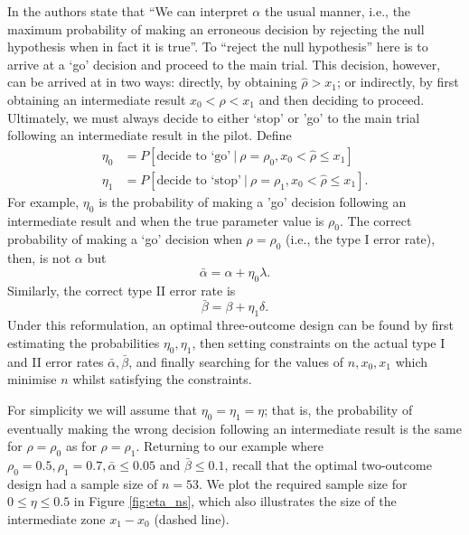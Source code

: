 \documentclass[sagev]{sagej} %
\begin{document}
In \cite{Sargent2001} the authors state that ``We  can interpret $\alpha$  the usual  manner,  i.e., the  maximum probability of making an erroneous decision by rejecting the null hypothesis when in fact it is true''. To ``reject the null hypothesis'' here is to arrive at a `go' decision and proceed to the main trial. This decision, however, can be arrived at in two ways: directly, by obtaining $\hat{\rho} > x_1$; or indirectly, by first obtaining an intermediate result $x_0 < \hat{\rho} < x_1$ and then deciding to proceed. Ultimately, we must always decide to either `stop' or 'go' to the main trial following an intermediate result in the pilot. Define
\begin{align}
\eta_0 &= P[\text{decide to `go'} ~|~ \rho = \rho_0, x_0 < \hat{\rho} \leq x_1] \\
\eta_1 &= P[\text{decide to `stop'} ~|~ \rho = \rho_1, x_0 < \hat{\rho} \leq x_1].
\end{align}
For example, $\eta_0$ is the probability of making a 'go' decision following an intermediate result and when the true parameter value is $\rho_0$. The correct probability of making a `go' decision when $\rho = \rho_0$ (i.e., the type I error rate), then, is not $\alpha$ but
$$
\bar{\alpha} = \alpha + \eta_0 \lambda.
$$
Similarly, the correct type II error rate is
$$
\bar{\beta} = \beta + \eta_1 \delta.
$$
Under this reformulation, an optimal three-outcome design can be found by first estimating the probabilities $\eta_0, \eta_1$, then setting constraints on the actual type I and II error rates $\bar{\alpha}, \bar{\beta}$, and finally searching for the values of  $n, x_0, x_1$ which minimise $n$ whilst satisfying the constraints. 

For simplicity we will assume that $\eta_0 = \eta_1 = \eta$; that is, the probability of eventually making the wrong decision following an intermediate result is the same for $\rho = \rho_0$ as for $\rho = \rho_1$. Returning to our example where $\rho_0 = 0.5, \rho_1 = 0.7, \bar{\alpha} \leq 0.05$ and $\bar{\beta} \leq 0.1$, recall that the optimal two-outcome design had a sample size of $n = 53$. We plot the required sample size for $0 \leq \eta \leq 0.5$ in Figure \ref{fig:eta_ns}, which also illustrates the size of the intermediate zone $x_1 - x_0$ (dashed line).
\end{document}

